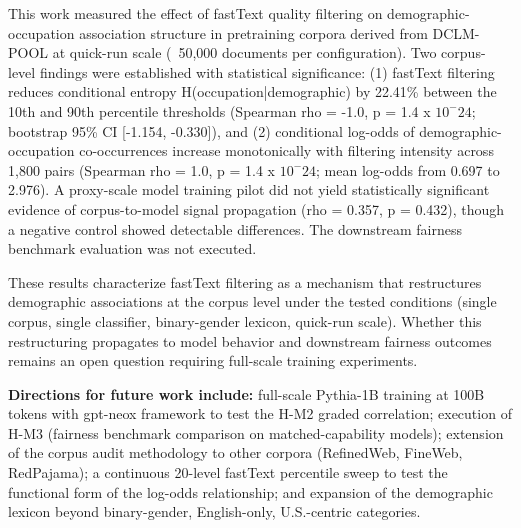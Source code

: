 
This work measured the effect of fastText quality filtering on demographic-occupation association structure in pretraining corpora derived from DCLM-POOL at quick-run scale (~50,000 documents per configuration). Two corpus-level findings were established with statistical significance: (1) fastText filtering reduces conditional entropy H(occupation|demographic) by 22.41\% between the 10th and 90th percentile thresholds (Spearman rho = -1.0, p = 1.4 x $10^-24$; bootstrap 95\% CI [-1.154, -0.330]), and (2) conditional log-odds of demographic-occupation co-occurrences increase monotonically with filtering intensity across 1,800 pairs (Spearman rho = 1.0, p = 1.4 x $10^-24$; mean log-odds from 0.697 to 2.976). A proxy-scale model training pilot did not yield statistically significant evidence of corpus-to-model signal propagation (rho = 0.357, p = 0.432), though a negative control showed detectable differences. The downstream fairness benchmark evaluation was not executed.

These results characterize fastText filtering as a mechanism that restructures demographic associations at the corpus level under the tested conditions (single corpus, single classifier, binary-gender lexicon, quick-run scale). Whether this restructuring propagates to model behavior and downstream fairness outcomes remains an open question requiring full-scale training experiments.

\textbf{Directions for future work include:} full-scale Pythia-1B training at 100B tokens with gpt-neox framework to test the H-M2 graded correlation; execution of H-M3 (fairness benchmark comparison on matched-capability models); extension of the corpus audit methodology to other corpora (RefinedWeb, FineWeb, RedPajama); a continuous 20-level fastText percentile sweep to test the functional form of the log-odds relationship; and expansion of the demographic lexicon beyond binary-gender, English-only, U.S.-centric categories.

